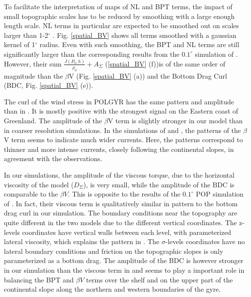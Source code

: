 \documentclass{ametsoc}
\newcommand{\jg}[1]{\textcolor{red}{JG: #1}}
\begin{document}
To facilitate the interpretation of maps of NL and BPT terms, the impact of small topographic scales has to be reduced by smoothing with a large enough length scale. 
NL terms in particular are expected to be smoothed out on scales larger than 1-2$^{\circ}$ \citep{hughes2001}. Fig. \ref{spatial_BV} shows all terms smoothed with a gaussian kernel of 1$^{\circ}$ radius. Even with such smoothing, the BPT and NL terms are still significantly larger than the corresponding results from the $0.1^{\circ}$ simulation of \citet{yeager2015}. However, their sum $\frac{J(P_b,h)}{\rho _0}+A_{\Sigma}$ (\ref{spatial_BV} (f))is of the same order of magnitude than the $\beta$V (Fig. \ref{spatial_BV} (a)) and the Bottom Drag Curl (BDC, Fig. \ref{spatial_BV} (e)). 

The curl of the wind stress in POLGYR has the same pattern and amplitude than in \citet{yeager2015}. It is mostly positive with the strongest signal on the Eastern coast of Greenland. The amplitude of the $\beta$V term is slightly stronger in our model than in coarser resolution simulations. In the simulations of \citet{hughes2001} and \citet{yeager2015}, the patterns of the $\beta$V term seems to indicate much wider currents. Here, the patterns correspond to thinner and more intense currents, closely following the continental slopes, in agreement with the observations.

In our simulations, the amplitude of the viscous torque, due to the horizontal viscosity of the model ($D_{\Sigma}$), is very small, while the amplitude of the BDC is comparable to the $\beta V$. This is opposite to the results of the $0.1^{\circ}$ POP simulation of \citet{yeager2015}. In fact, their viscous term is qualitatively similar in pattern to the bottom drag curl in our simulation. The boundary conditions near the topography are quite different in the two models due to the different vertical coordinates. The z-levels coordinates have vertical walls between each level, with parameterized lateral viscosity, which explains the pattern in \citet{yeager2015}. The $\sigma$-levels coordinates have no lateral boundary conditions and friction on the topographic slopes is only parameterized as a bottom drag. The amplitude of the BDC is however stronger in our simulation than the viscous term in \citet{yeager2015} and seems to play a important role in balancing the BPT and $\beta V$ terms over the shelf and on the upper part of the continental slope along the northern and western boundaries of the gyre.
\end{document}
